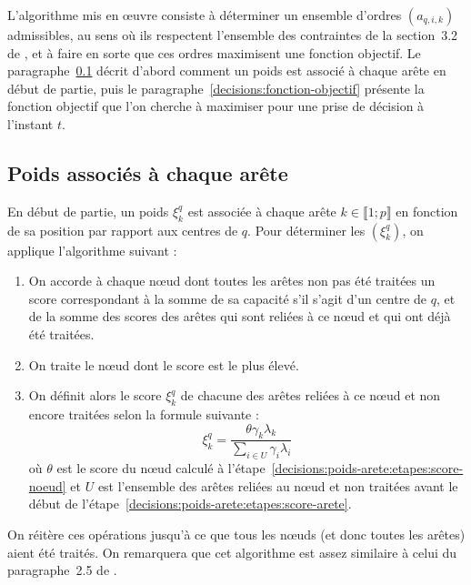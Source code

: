 \documentclass[a4paper,11pt,headings=normal]{scrartcl}
\theoremstyle{mythm}
\begin{document}
L'algorithme mis en œuvre consiste à déterminer un ensemble d'ordres
$(a_{q,i,k})$ admissibles, au sens où ils respectent l'ensemble des
contraintes de la section~3.2 de \cite{MarioReglesCourant}, et à faire
en sorte que ces ordres maximisent une fonction objectif. Le
paragraphe~\ref{decisions:poids-arete} décrit d'abord comment un poids
est associé à chaque arête en début de partie, puis le
paragraphe~\ref{decisions:fonction-objectif} présente la fonction
objectif que l'on cherche à maximiser pour une prise de décision à
l'instant $t$.

\subsection{Poids associés à chaque arête}
\label{decisions:poids-arete}

En début de partie, un poids $\xi^q_k$ est associée à chaque arête
$k \in \llbracket 1 ; p \rrbracket$ en fonction de sa position par
rapport aux centres de $q$. Pour déterminer les $(\xi^q_k)$, on
applique l'algorithme suivant :
\begin{enumerate}
  \item\label{decisions:poids-arete:etapes:score-noeud} On accorde à
    chaque nœud dont toutes les arêtes non pas été traitées un score
    correspondant à la somme de sa capacité s'il s'agit d'un centre de
    $q$, et de la somme des scores des arêtes qui sont reliées à ce
    nœud et qui ont déjà été traitées.

  \item On traite le nœud dont le score est le plus élevé.

  \item\label{decisions:poids-arete:etapes:score-arete} On définit
    alors le score $\xi^q_k$ de chacune des arêtes reliées à ce
    nœud et non encore traitées selon la formule suivante :
    \begin{equation}
      \xi^q_k = \frac{\theta \gamma_k \lambda_k}{\sum_{i \in U}
        \gamma_i \lambda_i}
    \end{equation}
    où $\theta$ est le score du nœud calculé à
    l'étape~\ref{decisions:poids-arete:etapes:score-noeud} et $U$ est
    l'ensemble des arêtes reliées au nœud et non traitées avant le
    début de l'étape~\ref{decisions:poids-arete:etapes:score-arete}.
\end{enumerate}
On réitère ces opérations jusqu'à ce que tous les nœuds (et donc
toutes les arêtes) aient été traités. On remarquera que cet algorithme
est assez similaire à celui du paragraphe~2.5 de
\cite{MarioGrapheCourant}.
\end{document}
